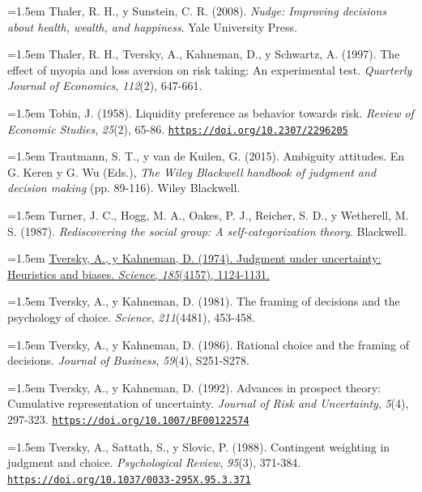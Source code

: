 \documentclass[10pt,a4paper]{article}
\begin{document}
\noindent\hangindent=1.5em Thaler, R. H., y Sunstein, C. R. (2008). \textit{Nudge: Improving decisions about health, wealth, and happiness}. Yale University Press.

\noindent\hangindent=1.5em Thaler, R. H., Tversky, A., Kahneman, D., y Schwartz, A. (1997). The effect of myopia and loss aversion on risk taking: An experimental test. \textit{Quarterly Journal of Economics}, \textit{112}(2), 647-661.

\noindent\hangindent=1.5em Tobin, J. (1958). Liquidity preference as behavior towards risk. \textit{Review of Economic Studies}, \textit{25}(2), 65-86. \href{https://doi.org/10.2307/2296205}{\nolinkurl{https://doi.org/10.2307/2296205}}

\noindent\hangindent=1.5em Trautmann, S. T., y van de Kuilen, G. (2015). Ambiguity attitudes. En G. Keren y G. Wu (Eds.), \textit{The Wiley Blackwell handbook of judgment and decision making} (pp. 89-116). Wiley Blackwell.

\noindent\hangindent=1.5em Turner, J. C., Hogg, M. A., Oakes, P. J., Reicher, S. D., y Wetherell, M. S. (1987). \textit{Rediscovering the social group: A self-categorization theory}. Blackwell.

\noindent\hangindent=1.5em \href{https://sites.socsci.uci.edu/~bskyrms/bio/readings/tversky_k_heuristics_biases.pdf}{Tversky, A., y Kahneman, D. (1974). Judgment under uncertainty: Heuristics and biases. \textit{Science}, \textit{185}(4157), 1124-1131.}

\noindent\hangindent=1.5em Tversky, A., y Kahneman, D. (1981). The framing of decisions and the psychology of choice. \textit{Science}, \textit{211}(4481), 453-458.

\noindent\hangindent=1.5em Tversky, A., y Kahneman, D. (1986). Rational choice and the framing of decisions. \textit{Journal of Business}, \textit{59}(4), S251-S278.

\noindent\hangindent=1.5em Tversky, A., y Kahneman, D. (1992). Advances in prospect theory: Cumulative representation of uncertainty. \textit{Journal of Risk and Uncertainty}, \textit{5}(4), 297-323. \href{https://doi.org/10.1007/BF00122574}{\nolinkurl{https://doi.org/10.1007/BF00122574}}

\noindent\hangindent=1.5em Tversky, A., Sattath, S., y Slovic, P. (1988). Contingent weighting in judgment and choice. \textit{Psychological Review}, \textit{95}(3), 371-384. \href{https://doi.org/10.1037/0033-295X.95.3.371}{\nolinkurl{https://doi.org/10.1037/0033-295X.95.3.371}}
\end{document}
